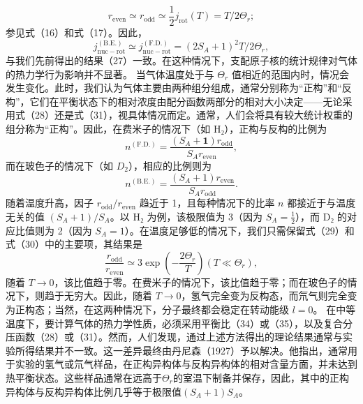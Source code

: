 \begin{equation}\tag{6.5.37}\label{eq:6.5.37}
r _ { \mathrm { e v e n } } \simeq r _ { \mathrm { o d d } } \simeq \frac { 1 } { 2 } j _ { \mathrm { r o t } } ( T ) = T / 2 \Theta _ { r } ;
\end{equation}
参见式（16）和式（17）。因此，
\begin{equation}\tag{6.5.38}\label{eq:6.5.38}
j _ { \mathrm { n u c - r o t } } ^{\mathrm { ( B . E . )} } \simeq j _ { \mathrm { n u c - r o t } } ^{\mathrm { ( F . D . )} } = ( 2 S _ { A } + 1 ) ^{2} T / 2 \Theta _ { r } ,
\end{equation}
与我们先前得出的结果（27）一致。在这种情况下，支配原子核的统计规律对气体的热力学行为影响并不显著。
当气体温度处于与 \(\Theta_{r}\) 值相近的范围内时，情况会发生变化。此时，我们认为气体主要由两种组分组成，通常分别称为“正构”和“反构”，它们在平衡状态下的相对浓度由配分函数两部分的相对大小决定——无论采用式（28）还是式（31），视具体情况而定。通常，人们会将具有较大统计权重的组分称为“正构”。因此，在费米子的情况下（如 H₂），正构与反构的比例为
\begin{equation}\tag{6.5.39}\label{eq:6.5.39}
n ^{\mathrm { ( F . D . )} } = \frac { ( S _ { A } + \mathbf { 1 } ) r _ { \mathrm { o d d } } } { S _ { A } r _ { \mathrm { e v e n } } } ,
\end{equation}
而在玻色子的情况下（如 \(D_{2}\)），相应的比例则为
\begin{equation}\tag{6.5.40}\label{eq:6.5.40}
n ^{\mathrm { ( B . E . )} } = \frac { ( S _ { A } + 1 ) r _ { \mathrm { e v e n } } } { S _ { A } r _ { \mathrm { o d d } } } .
\end{equation}
随着温度升高，因子 \(r_{\mathrm{odd}}/r_{\mathrm{even}}\) 趋近于 1，且每种情况下的比率 \(n\) 都接近于与温度无关的值 \((S_{A}+1)/S_{A}\)。以 H₂ 为例，该极限值为 3（因为 \(S_{A}=\frac{1}{2}\)），而 D₂ 的对应比值则为 2（因为 \(S_{A}=1\)）。在温度足够低的情况下，我们只需保留式（29）和式（30）中的主要项，其结果是
\begin{equation}\tag{6.5.41}\label{eq:6.5.41}
\frac { r _ { \mathrm { o d d } } } { r _ { \mathrm { e v e n } } } \simeq 3 \exp \left( - \frac { 2 \Theta _ { r } } { T } \right)  ( T \ll \Theta _ { r } ) ,
\end{equation}
随着 \(T \to 0\)，该比值趋于零。在费米子的情况下，该比值趋于零；而在玻色子的情况下，则趋于无穷大。因此，随着 \(T \to 0\)，氢气完全变为反构态，而氘气则完全变为正构态；当然，在这两种情况下，分子最终都会稳定在转动能级 \(l = 0\)。
在中等温度下，要计算气体的热力学性质，必须采用平衡比（34）或（35），以及复合分压函数（28）或（31）。然而，人们发现，通过上述方法得出的理论结果通常与实验所得结果并不一致。这一差异最终由丹尼森（1927）予以解决。他指出，通常用于实验的氢气或氘气样品，在正构异构体与反构异构体的相对含量方面，并未达到热平衡状态。这些样品通常在远高于\(\Theta_{r}\)的室温下制备并保存，因此，其中的正构异构体与反构异构体比例几乎等于极限值\((S_{A}+1)S_{A}\)。
